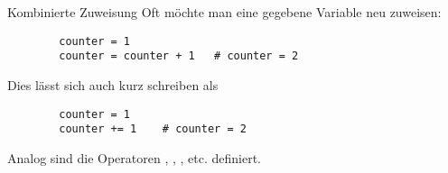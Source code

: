\begin{fragile}[]
\begin{block}{Kombinierte Zuweisung}
		\vspace{2pt}
		Oft möchte man eine gegebene Variable neu zuweisen: 
		\begin{verbatim}
		counter = 1
		counter = counter + 1 	# counter = 2
		\end{verbatim}
		\pause
		Dies lässt sich auch kurz schreiben als 
		\begin{verbatim}
		counter = 1
		counter += 1 	# counter = 2
		\end{verbatim}
		\pause
		Analog sind die Operatoren \py{-=}, \py{*=}, \py{/=}, etc. definiert. 
	\end{block}
\end{fragile}



